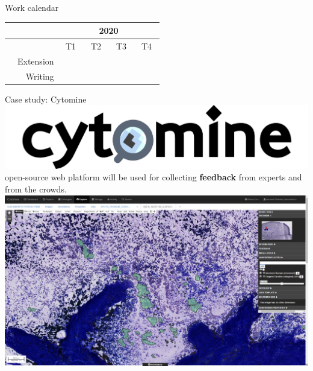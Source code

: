 \documentclass{beamer}
\begin{document}
\begin{frame}{Work calendar}
\begin{table}
\vfill

	\begin{tabular}{|c|r|cccccccccccc|}
		\hline
		& & \multicolumn{12}{c|}{2020}  \\
		\hline	
		& & \multicolumn{3}{c|}{T1} & \multicolumn{3}{c|}{T2} & \multicolumn{3}{c|}{T3} & \multicolumn{3}{c|}{T4} \\ 
		\hline
		& Extension & \cellcolor{black} & \cellcolor{black} & & & & & & & & &  & \\
		& Writing & & & \cellcolor{black} & \cellcolor{black} & \cellcolor{black} & \cellcolor{black} & \cellcolor{black} & \cellcolor{black} & & & & \\
		\hline 
	\end{tabular}


	\end{table}
\end{frame}


\begin{frame}{Case study: Cytomine}
	\includegraphics[scale=0.07]{images/cytomine_typo.png} \text{ } open-source web platform will be used for collecting \textbf{feedback} from experts and from the crowds. \\  
	\vspace*{0.25cm}
	\hspace*{-0.75in}\includegraphics[scale=0.22]{images/cytomine.png}
\end{frame}
\end{document}
